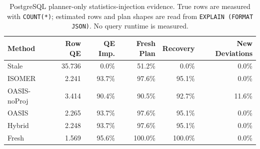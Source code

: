 \begin{table}[t]
  \centering
  \small
  \caption{PostgreSQL planner-only statistics-injection evidence. True rows are measured with \texttt{COUNT(*)}; estimated rows and plan shapes are read from \texttt{EXPLAIN (FORMAT JSON)}. No query runtime is measured.}
  \label{tab:postgres_planner_stats_injection}
  \setlength{\tabcolsep}{4pt}
  \begin{tabular}{lrrrrr}
    \toprule
    Method & Row QE & QE Imp. & Fresh Plan & Recovery & New Deviations \\
    \midrule
    Stale & 35.736 & 0.0\% & 51.2\% & 0.0\% & 0.0\% \\
    ISOMER & 2.241 & 93.7\% & 97.6\% & 95.1\% & 0.0\% \\
    OASIS-noProj & 3.414 & 90.4\% & 90.5\% & 92.7\% & 11.6\% \\
    OASIS & 2.265 & 93.7\% & 97.6\% & 95.1\% & 0.0\% \\
    Hybrid & 2.248 & 93.7\% & 97.6\% & 95.1\% & 0.0\% \\
    Fresh & 1.569 & 95.6\% & 100.0\% & 100.0\% & 0.0\% \\
    \bottomrule
  \end{tabular}
\end{table}
